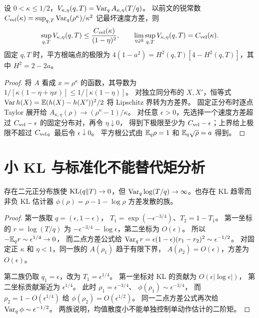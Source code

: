 \begin{proposition}[有限步最坏方差的小步极限]
\label{prop:finite-variance-limit}
设 $0<\kappa\le1/2$，$V_{\kappa,\eta}(q,T)=\operatorname{Var}_q A_{\kappa,\eta}(T/q)$。
以前文的锐常数
$C_{\rm vel}(\kappa)=\sup_{q,T}\operatorname{Var}_q(\rho^\kappa)/\kappa^2$ 记最坏速度方差，则
\begin{equation}
\sup_{q,T}V_{\kappa,\eta}(q,T)
\le\frac{C_{\rm vel}(\kappa)}{(1-\eta)^2},\qquad
\lim_{\eta\downarrow0}\sup_{q,T}V_{\kappa,\eta}(q,T)
=C_{\rm vel}(\kappa).
\end{equation}
固定 $q,T$ 时，平方根端点的极限为
$4(1-a^2)=H^2(q,T)[4-H^2(q,T)]$，其中 $H^2=2-2a$。
\end{proposition}
\begin{proof}
将 $A$ 看成 $x=\rho^\kappa$ 的函数，其导数为
$1/[\kappa(1-\eta+\eta x)]\le1/[\kappa(1-\eta)]$。
对独立同分布的 $X,X'$，恒等式
$\operatorname{Var} h(X)=\mathbb E(h(X)-h(X'))^2/2$ 将 Lipschitz 界转为方差界。
固定正分布时逐点 Taylor 展开给
$A_{\kappa,\eta}(\rho)\to(\rho^\kappa-1)/\kappa$。
对任意 $\epsilon>0$，先选择一个速度方差超过
$C_{\rm vel}-\epsilon$ 的固定分布对，再令 $\eta\downarrow0$，
得到下极限至少为 $C_{\rm vel}-\epsilon$；上界给上极限不超过
$C_{\rm vel}$。最后令 $\epsilon\downarrow0$。
平方根公式由 $\mathbb E_q\rho=1$ 和 $\mathbb E_q\sqrt\rho=a$ 得到。
\end{proof}

\section{小 KL 与标准化不能替代矩分析}
\begin{proposition}[KL 趋零而监督方差发散]
\label{prop:small-kl-large-variance}
存在二元正分布族使 $\operatorname{KL}(q\Vert T)\to0$，但
$\operatorname{Var}_q\log(T/q)\to\infty$。也存在 KL 趋零而非负 KL 估计器
$\phi(\rho)=\rho-1-\log\rho$ 方差发散的族。
\end{proposition}
\begin{proof}
第一族取 $q=(\epsilon,1-\epsilon)$，
$T_1=\exp(-\epsilon^{-3/4})$、$T_2=1-T_1$。
第一坐标的 $r=\log(T/q)$ 为
$-\epsilon^{-3/4}-\log\epsilon$，第二坐标为 $O(\epsilon)$。
所以 $-\mathbb E_qr\sim\epsilon^{1/4}\to0$，
而二点方差公式给
$\operatorname{Var}_qr=\epsilon(1-\epsilon)(r_1-r_2)^2\sim\epsilon^{-1/2}$。
对固定正 $\kappa$ 和 $\eta<1$，同一族的 $A(\rho_1)$ 趋于有限下界，
$A(\rho_2)=O(\epsilon)$，方差为 $O(\epsilon)$。

第二族仍取 $q_1=\epsilon$，改为 $T_1=\epsilon^{1/4}$。
第一坐标对 KL 的贡献为 $O(\epsilon|\log\epsilon|)$，
第二坐标贡献渐近为 $\epsilon^{1/4}$。
此时 $\rho_1=\epsilon^{-3/4}$、
$\phi(\rho_1)\sim\epsilon^{-3/4}$，
而 $\rho_2=1-O(\epsilon^{1/4})$ 给 $\phi(\rho_2)=O(\epsilon^{1/2})$。
同一二点方差公式再次给 $\operatorname{Var}_q\phi\sim\epsilon^{-1/2}$。
两族说明，均值散度小不能单独控制单动作估计的二阶矩。
\end{proof}

